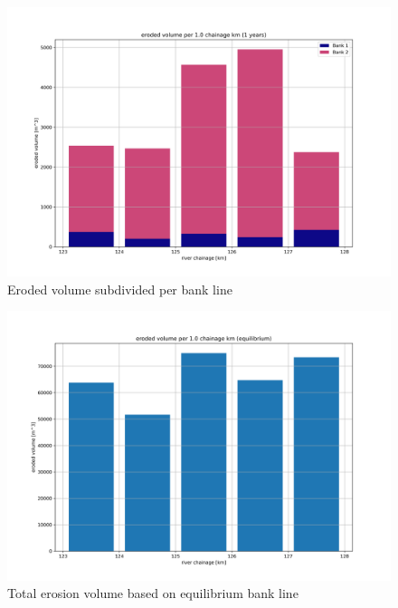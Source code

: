 \begin{figure}
\includegraphics[width=\textwidth]{figures/4_eroded_volume_per_bank.png}
\caption{Eroded volume subdivided per bank line}
\label{Fig2.6b}
\end{figure}

\begin{figure}
\includegraphics[width=\textwidth]{figures/5_eroded_volume_eq.png}
\caption{Total erosion volume based on equilibrium bank line}
\label{Fig2.7}
\end{figure}

